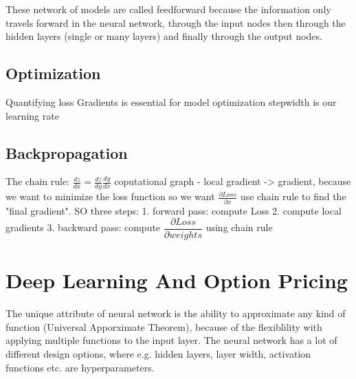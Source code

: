 These network of models are called feedforward because the information only travels forward in the neural network, through the input nodes then through the hidden layers (single or many layers) and finally through the output nodes. 

\subsection{Optimization}
Quantifying loss
Gradients is essential for model optimization
stepwidth is our learning rate

\subsection{Backpropagation}
The chain rule: $\frac{dz}{dx}= \frac{dz}{dy} \frac{dy}{dx}$
coputational graph - local gradient -> gradient, because we want to minimize the loss function
so we want $\frac{\partial Loss}{\partial x}$ use chain rule to find the "final gradient".
SO three steps:
1. forward pass: compute Loss
2. compute local gradients
3. backward pass: compute $\dfrac{\partial Loss}{\partial weights}$ using chain rule



\section{Deep Learning And Option Pricing}

The unique attribute of neural network is the ability to approximate any kind of function (Universal Apporximate Theorem), because of the flexiblility with applying multiple functions to the input layer. The neural network has a lot of different design options, where e.g. hidden layers, layer width, activation functions etc. are hyperparameters.